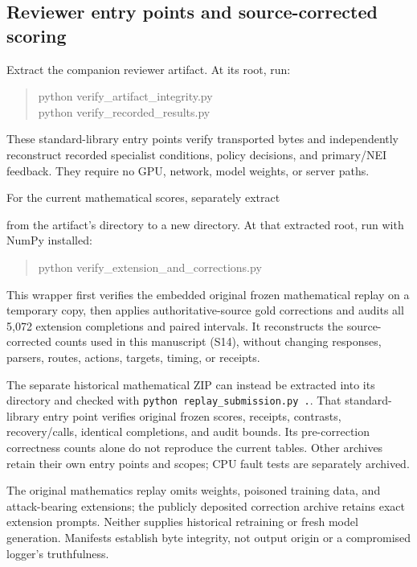 \documentclass[journal,onecolumn]{IEEEtran}
\begin{document}
\subsection{Reviewer entry points and source-corrected scoring}
Extract the companion reviewer artifact. At its root, run:
\begin{quote}\ttfamily\small
python verify\_artifact\_integrity.py\\
python verify\_recorded\_results.py
\end{quote}
These standard-library entry points verify transported bytes and independently reconstruct recorded specialist conditions, policy decisions, and primary/NEI feedback. They require no GPU, network, model weights, or server paths.

For the current mathematical scores, separately extract
\begin{quote}\small
{}
\end{quote}
from the artifact's  directory to a new directory. At that extracted root, run with NumPy installed:
\begin{quote}\ttfamily\small
python verify\_extension\_and\_corrections.py
\end{quote}
This wrapper first verifies the embedded original frozen mathematical replay on a temporary copy, then applies authoritative-source gold corrections and audits all 5,072 extension completions and paired intervals. It reconstructs the source-corrected counts used in this manuscript (S14), without changing responses, parsers, routes, actions, targets, timing, or receipts.

The separate historical mathematical ZIP can instead be extracted into its  directory and checked with \texttt{python replay\_submission.py .}. That standard-library entry point verifies original frozen scores, receipts, contrasts, recovery/calls, identical completions, and audit bounds. Its pre-correction correctness counts alone do not reproduce the current tables. Other archives retain their own entry points and scopes; CPU fault tests are separately archived.

The original mathematics replay omits weights, poisoned training data, and attack-bearing extensions; the publicly deposited correction archive retains exact extension prompts. Neither supplies historical retraining or fresh model generation. Manifests establish byte integrity, not output origin or a compromised logger's truthfulness.
\end{document}
